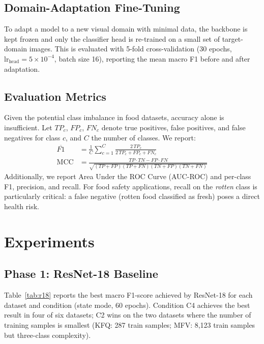 \documentclass[conference]{IEEEtran}
\begin{document}
\subsection{Domain-Adaptation Fine-Tuning}
\label{sec:ftmethod}

To adapt a model to a new visual domain with minimal data, the backbone
is kept frozen and only the classifier head is re-trained on a small set
of target-domain images.
This is evaluated with 5-fold cross-validation
(30 epochs, $\text{lr}_\text{head} = 5\times10^{-4}$, batch size 16),
reporting the mean macro F1 before and after adaptation.

\subsection{Evaluation Metrics}

Given the potential class imbalance in food datasets, accuracy alone is
insufficient. Let $TP_c$, $FP_c$, $FN_c$ denote true positives, false
positives, and false negatives for class $c$, and $C$ the number of
classes.
We report:
\begin{align}
    \overline{F1} &= \frac{1}{C}\sum_{c=1}^{C}
    \frac{2\,TP_c}{2\,TP_c + FP_c + FN_c} \\
    \text{MCC} &= \frac{TP \cdot TN - FP \cdot FN}
    {\sqrt{(TP+FP)(TP+FN)(TN+FP)(TN+FN)}}
\end{align}
Additionally, we report Area Under the ROC Curve (AUC-ROC) and
per-class F1, precision, and recall.
For food safety applications, recall on the \textit{rotten} class is
particularly critical: a false negative (rotten food classified as fresh)
poses a direct health risk.

\section{Experiments}
\label{sec:experiments}

\subsection{Phase 1: ResNet-18 Baseline}

Table~\ref{tab:r18} reports the best macro F1-score achieved by
ResNet-18 for each dataset and condition (state mode, 60 epochs).
Condition C4 achieves the best result in four of six datasets;
C2 wins on the two datasets where the number of training samples
is smallest (KFQ: 287 train samples; MFV: 8,123 train samples
but three-class complexity).
\end{document}
